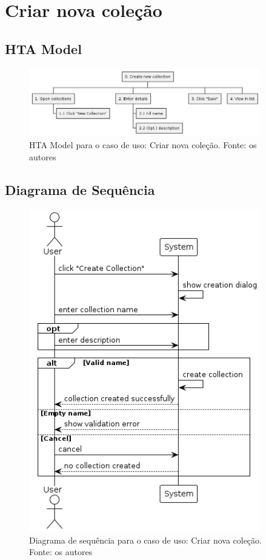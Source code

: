 \section{Criar nova coleção}

\subsection{HTA Model}

\begin{figure}[H]
    \centering
    \includegraphics[width=0.9\textwidth]{../figures/hta/UC007.png}
    \caption{HTA Model para o caso de uso: Criar nova coleção. Fonte: os autores}
    \label{fig:hta-uc007}
\end{figure}

\subsection{Diagrama de Sequência}

\begin{figure}[H]
    \centering
    \includegraphics[width=0.9\textwidth]{../figures/dss/UC007.png}
    \caption{Diagrama de sequência para o caso de uso: Criar nova coleção. Fonte: os autores}
    \label{fig:dss-uc007}
\end{figure}

